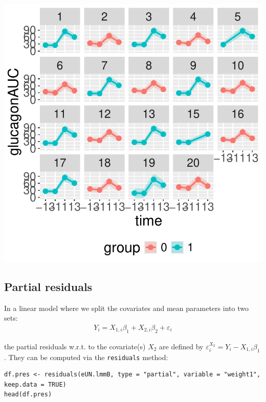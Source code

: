 \documentclass[12pt]{article}
\begin{document}
\begin{minipage}{0.3\linewidth}
\begin{center}
\includegraphics[width=\textwidth]{./figures/fit-autoplot-indiv.pdf}
\end{center}
\end{minipage}

\clearpage

\subsection{Partial residuals}
\label{sec:org16a6fb1}

In a linear model where we split the covariates and mean parameters into two sets:
\begin{align*}
Y_i = X_{1,i} \beta_1 + X_{2,i} \beta_2 + \varepsilon_i
\end{align*}

\noindent the partial residuals w.r.t. to the covariate(s) \(X_2\) are defined
by \(\varepsilon^{X_2}_{i} = Y_i - X_{1,i} \beta_1\). \newline They can be
computed via the \texttt{residuals} method:
\lstset{language=r,label= ,caption= ,captionpos=b,numbers=none}
\begin{lstlisting}
df.pres <- residuals(eUN.lmmB, type = "partial", variable = "weight1", keep.data = TRUE)
head(df.pres)
\end{lstlisting}
\end{document}
